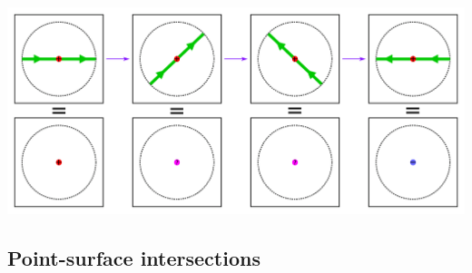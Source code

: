 \begin{center}
\includegraphics[width = \textwidth]{Intersections/Undefined_intersections/point_path_intersection_contradiction_2}
\end{center}




\subsection{Point-surface intersections}

